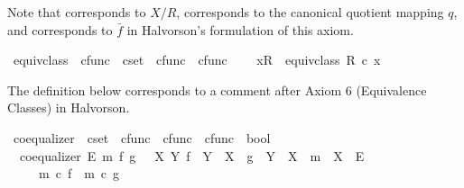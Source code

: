 \begin{isabellebody}
\begin{isamarkuptext}%
Note that \isa{{\isacharparenleft}{\kern0pt}{\isasymsslash}{\isacharparenright}{\kern0pt}} corresponds to $X/R$,  corresponds to the
  canonical quotient mapping $q$, and  corresponds to $\bar{f}$ in Halvorson's
  formulation of this axiom.%
\end{isamarkuptext}\isamarkuptrue%
\isamarkupfalse%
\ equiv{\isacharunderscore}{\kern0pt}class{\isacharprime}{\kern0pt}\ {\isacharcolon}{\kern0pt}{\isacharcolon}{\kern0pt}\ {\isachardoublequoteopen}cfunc\ {\isasymRightarrow}\ cset\ {\isasymtimes}\ cfunc\ {\isasymRightarrow}\ cfunc{\isachardoublequoteclose}\ {\isacharparenleft}{\kern0pt}{\isachardoublequoteopen}{\isacharbrackleft}{\kern0pt}{\isacharunderscore}{\kern0pt}{\isacharbrackright}{\kern0pt}\isactrlbsub {\isacharunderscore}{\kern0pt}\isactrlesub {\isachardoublequoteclose}{\isacharparenright}{\kern0pt}\ \isanewline
\ \ {\isachardoublequoteopen}{\isacharbrackleft}{\kern0pt}x{\isacharbrackright}{\kern0pt}\isactrlbsub R\isactrlesub \ {\isasymequiv}\ equiv{\isacharunderscore}{\kern0pt}class\ R\ {\isasymcirc}\isactrlsub c\ x{\isachardoublequoteclose}%
\isadelimdocument
%
\endisadelimdocument
%
\isatagdocument
%
\isamarkuptrue%
%
\endisatagdocument
{\isafolddocument}%
%
\isadelimdocument
%
\endisadelimdocument
%
\begin{isamarkuptext}%
The definition below corresponds to a comment after Axiom 6 (Equivalence Classes) in Halvorson.%
\end{isamarkuptext}\isamarkuptrue%
\isamarkupfalse%
\ coequalizer\ {\isacharcolon}{\kern0pt}{\isacharcolon}{\kern0pt}\ {\isachardoublequoteopen}cset\ {\isasymRightarrow}\ cfunc\ {\isasymRightarrow}\ cfunc\ {\isasymRightarrow}\ cfunc\ {\isasymRightarrow}\ bool{\isachardoublequoteclose}\ \isanewline
\ \ {\isachardoublequoteopen}coequalizer\ E\ m\ f\ g\ {\isasymlongleftrightarrow}\ {\isacharparenleft}{\kern0pt}{\isasymexists}\ X\ Y{\isachardot}{\kern0pt}\ {\isacharparenleft}{\kern0pt}f\ {\isacharcolon}{\kern0pt}\ Y\ {\isasymrightarrow}\ X{\isacharparenright}{\kern0pt}\ {\isasymand}\ {\isacharparenleft}{\kern0pt}g\ {\isacharcolon}{\kern0pt}\ Y\ {\isasymrightarrow}\ X{\isacharparenright}{\kern0pt}\ {\isasymand}\ {\isacharparenleft}{\kern0pt}m\ {\isacharcolon}{\kern0pt}\ X\ {\isasymrightarrow}\ E{\isacharparenright}{\kern0pt}\isanewline
\ \ \ \ {\isasymand}\ {\isacharparenleft}{\kern0pt}m\ {\isasymcirc}\isactrlsub c\ f\ {\isacharequal}{\kern0pt}\ m\ {\isasymcirc}\isactrlsub c\ g{\isacharparenright}{\kern0pt}\isanewline

\end{isabellebody}
